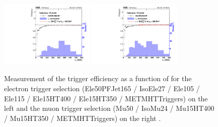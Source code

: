 \begin{figure}[!hbt]
  \begin{center}
    \includegraphics[width=0.4\textwidth]{Plots/trigger/LT_PFJet450_EffFit_test_HLT_EleORORHLT_MetOR.pdf}
    \includegraphics[width=0.4\textwidth]{Plots/trigger/LT_PFJet450_EffFit_test_HLT_MuORORHLT_MetOR.pdf}
  \end{center}
  \caption{Measurement of the trigger efficiency as a function of \LT for the
    electron trigger selection (Ele50PFJet165 / IsoEle27 / Ele105 / Ele115 /
    Ele15HT400 / Ele15HT350 / METMHTTriggers) on the left and the muon trigger
    selection (Mu50 / IsoMu24 / Mu15HT400 / Mu15HT350 / METMHTTriggers) on the
    right \cite{trigger}.
  \label{fig:trig_eff_LT}}
  \end{figure}
